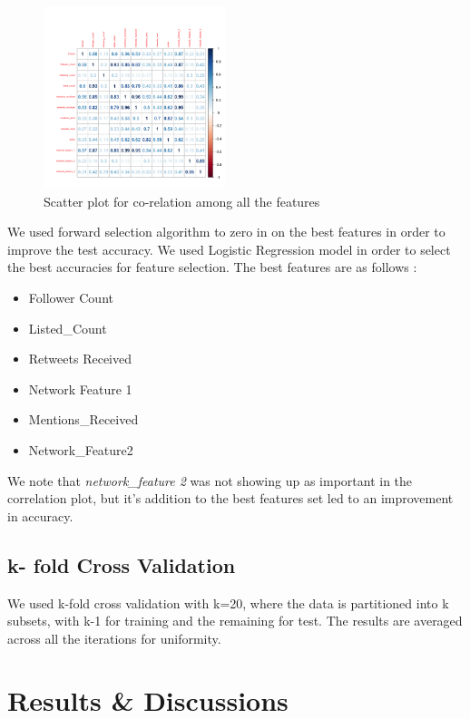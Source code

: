\documentclass[conference]{IEEEtran}
\numberwithin{equation}{section}
\numberwithin{figure}{section}
\numberwithin{table}{section}
\begin{document}
\begin{figure}
\centering
  \includegraphics[width=200px, height = 200px]{scatter_plt}
  \caption{Scatter plot for co-relation among all the features }
  \label{fs_fig}
\end{figure}
We used forward selection algorithm to zero in on the best features in order to improve the test accuracy. We used Logistic Regression model in order to select the best accuracies for feature selection. The best features are as follows :
\begin{itemize}
\item Follower Count
\item Listed\_Count
\item Retweets Received
\item Network Feature 1
\item Mentions\_Received
\item Network\_Feature2
\end{itemize}

We note that \textit{network\_feature 2} was not showing up as important in the correlation plot, but it's addition to the best features set led to an improvement in accuracy.

\subsection{k- fold Cross Validation}
We used k-fold cross validation with k=20, where the data is partitioned into k subsets, with k-1 for training and the remaining for test. The results are averaged across all the iterations for uniformity.    

\section{Results \& Discussions}
\end{document}

